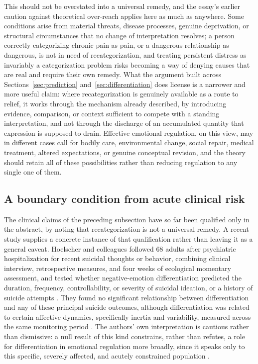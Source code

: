 \documentclass[11pt]{article}
\begin{document}
This should not be overstated into a universal remedy, and the essay's earlier caution against theoretical over-reach applies here as much as anywhere. Some conditions arise from material threats, disease processes, genuine deprivation, or structural circumstances that no change of interpretation resolves; a person correctly categorizing chronic pain as pain, or a dangerous relationship as dangerous, is not in need of recategorization, and treating persistent distress as invariably a categorization problem risks becoming a way of denying causes that are real and require their own remedy. What the argument built across Sections~\ref{sec:prediction} and~\ref{sec:differentiation} does license is a narrower and more useful claim: where recategorization is genuinely available as a route to relief, it works through the mechanism already described, by introducing evidence, comparison, or context sufficient to compete with a standing interpretation, and not through the discharge of an accumulated quantity that expression is supposed to drain. Effective emotional regulation, on this view, may in different cases call for bodily care, environmental change, social repair, medical treatment, altered expectations, or genuine conceptual revision, and the theory should retain all of these possibilities rather than reducing regulation to any single one of them.

\subsection{A boundary condition from acute clinical risk}

The clinical claims of the preceding subsection have so far been qualified only in the abstract, by noting that recategorization is not a universal remedy. A recent study supplies a concrete instance of that qualification rather than leaving it as a general caveat. Hoelscher and colleagues followed 68 adults after psychiatric hospitalization for recent suicidal thoughts or behavior, combining clinical interview, retrospective measures, and four weeks of ecological momentary assessment, and tested whether negative-emotion differentiation predicted the duration, frequency, controllability, or severity of suicidal ideation, or a history of suicide attempts \citep{Hoelscher2026}. They found no significant relationship between differentiation and any of these principal suicide outcomes, although differentiation was related to certain affective dynamics, specifically inertia and variability, measured across the same monitoring period \citep{Hoelscher2026}. The authors' own interpretation is cautious rather than dismissive: a null result of this kind constrains, rather than refutes, a role for differentiation in emotional regulation more broadly, since it speaks only to this specific, severely affected, and acutely constrained population \citep{Hoelscher2026}.
\end{document}
